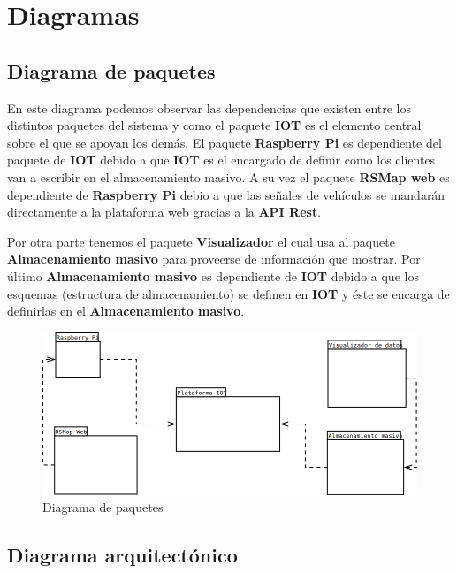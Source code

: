 \newpage
\section{Diagramas}
\subsection{Diagrama de paquetes}

En este diagrama podemos observar las dependencias que existen entre los distintos paquetes del sistema y como el paquete \textbf{IOT} es el elemento central sobre el que se apoyan los demás. El paquete \textbf{Raspberry Pi} es dependiente del paquete de \textbf{IOT} debido a que \textbf{IOT} es el encargado de definir como los clientes van a escribir en el almacenamiento masivo. A su vez el paquete \textbf{RSMap web} es dependiente de \textbf{Raspberry Pi} debio a que las señales de vehículos se mandarán directamente a la plataforma web gracias a la \textbf{API Rest}.

Por otra parte tenemos el paquete \textbf{Visualizador} el cual usa al paquete \textbf{Almacenamiento masivo} para proveerse de información que mostrar. Por último \textbf{Almacenamiento masivo} es dependiente de \textbf{IOT} debido a que los esquemas (estructura de almacenamiento) se definen en \textbf{IOT} y éste se encarga de definirlas en el \textbf{Almacenamiento masivo}.

\begin{figure}[!ht]
  \begin{center}
    \includegraphics[scale=0.50]{../images/diag_plan/paquetes.png}
    \caption{Diagrama de paquetes}
    \label{fig:paquetes}
  \end{center}
\end{figure}

\newpage

\subsection{Diagrama arquitectónico}

